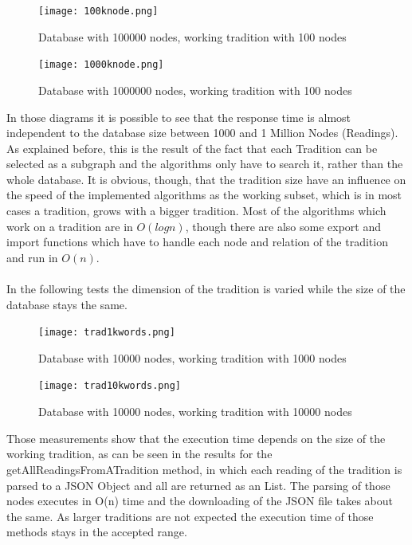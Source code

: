 \documentclass[11pt,fleqn,openany]{book} %
\begin{document}
\begin{figure}[h!]
  \caption{Database with 100000 nodes,  working tradition with 100 nodes }
  \centering
    \texttt{[image: 100knode.png]}
\end{figure}

\begin{figure}[h!]
  \caption{Database with 1000000 nodes,  working tradition with 100 nodes }
  \centering
    \texttt{[image: 1000knode.png]}
\end{figure}
In those diagrams it is possible to see that the response time is almost independent to the database size between 1000 and 1 Million Nodes (Readings). As explained before, this is the result of the fact that each Tradition can be selected as a subgraph and the algorithms only have to search it, rather than the whole database. It is obvious, though, that the tradition size have an influence on the speed of the implemented algorithms as the working subset, which is in most cases a tradition, grows with a bigger tradition. Most of the algorithms which work on a tradition are in $O(log n)$, though there are also some export and import functions which have to handle each node and relation of the tradition and run in $O(n)$. 
\\ \quad \\
In the following tests the dimension of the tradition is varied while the size of the database stays the same. 
\begin{figure}[h!]
  \caption{Database with 10000 nodes,  working tradition with 1000 nodes }
  \centering
    \texttt{[image: trad1kwords.png]}
\end{figure}
\begin{figure}[h!]
  \caption{Database with 10000 nodes,  working tradition with 10000 nodes }
  \centering
    \texttt{[image: trad10kwords.png]}
\end{figure}
Those measurements show that the execution time depends on the size of the working tradition, as can be seen in the results for the getAllReadingsFromATradition method, in which each reading of the tradition is parsed to a JSON Object and all are returned as an List. The parsing of those nodes executes in O(n) time and the downloading of the JSON file takes about the same. As larger traditions are not expected the execution time of those methods stays in the accepted range.

\end{document}
